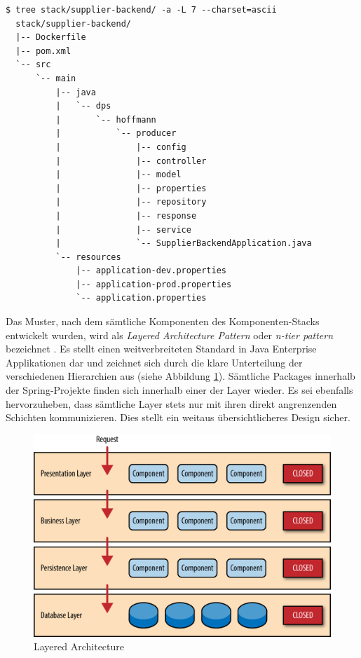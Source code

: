 \label{verb:supplierStruct}
\begin{minipage}{\linewidth}
\begin{lstlisting}[caption={Supplier Backend - Struktur},style=bashStyle]
  $ tree stack/supplier-backend/ -a -L 7 --charset=ascii
  stack/supplier-backend/
  |-- Dockerfile
  |-- pom.xml
  `-- src
      `-- main
          |-- java
          |   `-- dps
          |       `-- hoffmann
          |           `-- producer
          |               |-- config
          |               |-- controller
          |               |-- model
          |               |-- properties
          |               |-- repository
          |               |-- response
          |               |-- service
          |               `-- SupplierBackendApplication.java
          `-- resources
              |-- application-dev.properties
              |-- application-prod.properties
              `-- application.properties
\end{lstlisting}
\end{minipage}

Das Muster, nach dem sämtliche Komponenten des Komponenten-Stacks entwickelt wurden, wird als \emph{Layered Architecture Pattern} oder \emph{n-tier pattern} bezeichnet \cite{oreilly-layered-arch}. Es stellt einen weitverbreiteten Standard in Java Enterprise Applikationen dar und zeichnet sich durch die klare Unterteilung der verschiedenen Hierarchien aus (siehe Abbildung \ref{fig:layeredArchitecture}). Sämtliche Packages innerhalb der Spring-Projekte finden sich innerhalb einer der Layer wieder. Es sei ebenfalls hervorzuheben, dass sämtliche Layer stets nur mit ihren direkt angrenzenden Schichten kommunizieren. Dies stellt ein weitaus übersichtlicheres Design sicher.

\begin{figure}[ht!]
	\centering
	\includegraphics[width=.7\linewidth]{kapitel/problemloesung/implementierung/_img/dataflow-overview-01}
	\caption[Layered Architecture]{Layered Architecture \cite{oreilly-layered-arch}}
	\label{fig:layeredArchitecture}
\end{figure}


